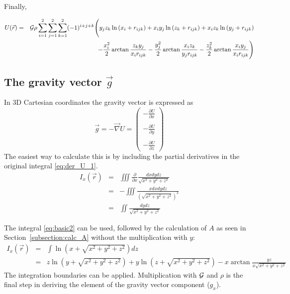 
Finally,
\begin{mdframed}[backgroundcolor=blue!5]
\begin{eqnarray}
U(\vec{r}) &=& {\cal G}  \rho 
\sum_{i=1}^{2} \sum_{j=1}^{2} \sum_{k=1}^{2} (-1)^{i+j+k} \Bigg( 
y_j z_k \ln{\left( x_i + r_{ijk} \right)} + 
x_i y_j \ln{\left( z_k + r_{ijk} \right)} + 
x_i z_k \ln{\left( y_j+r_{ijk} \right)}   \nonumber\\ 
&&  \qquad \qquad - 
\frac{x_i^2}{2} \arctan{\frac{z_k y_j}{x_i r_{ijk}}} - 
\frac{y_j^2}{2} \arctan{\frac{x_i z_k}{y_j r_{ijk}}} - 
\frac{z_k^2}{2} \arctan{\frac{x_i y_j}{x_i r_{ijk}}} 
\Bigg) 
\end{eqnarray}
\end{mdframed}








\subsection{The gravity vector $\vec{g}$}

In 3D Cartesian coordinates the gravity vector is expressed as
\begin{equation}
\vec{g} = -\vec\nabla U  = 
\left( 
\begin{array}{c} 
-\frac{\partial U}{\partial x} \\ \\
-\frac{\partial U}{\partial y} \\ \\
-\frac{\partial U}{\partial z} 
\end{array} \right)
\end{equation}
The easiest way to calculate this is by including the partial derivatives in the original integral \eqref{eq:der_U_1}.
\begin{eqnarray}
I_x(\vec{r}) 
&=& \iiint \frac{\partial}{\partial x} \frac{dx dy dz}{\sqrt{x^2+y^2+z^2}} \nonumber\\
&=& -\iiint \frac{x dx dy dz}{(\sqrt{x^2+y^2+z^2})^3} \nonumber\\
&=& \iint \frac{dy dz}{\sqrt{x^2+y^2+z^2}}
\end{eqnarray}

The integral \eqref{eq:basic2} can be used, followed by the calculation of $A$ as seen in Section~\ref{subsection:calc_A} 
without the multiplication with $y$:
\begin{eqnarray}
I_x(\vec{r})
&=& \int \ln{\left( x + \sqrt{x^2+y^2+z^2} \right)} dz \nonumber\\
&=& 
z \ln{\left( y + \sqrt{x^2+y^2+z^2} \right)} + 
y \ln{\left( z + \sqrt{x^2+y^2+z^2} \right)} - 
x \arctan{\frac{yz}{x \sqrt{x^2+y^2+z^2}}}
\end{eqnarray}
The integration boundaries can be applied. Multiplication with ${\cal G}$ and $\rho$ is the final step in deriving the element of 
the gravity vector component ($g_x$). 

